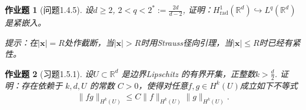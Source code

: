 \documentclass[UTF8,fontset=windows,12pt]{ctexart}
\theoremstyle{kaiti-theorem}
\newtheorem{problem}{作业题}
\numberwithin{equation}{section}
\newcommand{\R}{\mathbb{R}}
\newcommand{\bds}[1]{\boldsymbol{#1}}  %
\newcommand{\xx}{{\bds{x}}}
\begin{document}
\begin{problem}[问题1.4.5]
设$d\geqslant 2$, $2<q<2^*:=\frac{2d}{d-2}$, 证明：$H_{\text{rad}}^1(\R^d)\hookrightarrow L^q(\R^d)$ 是紧嵌入。

提示：在$|\xx|=R$处作截断，当$|\xx|>R$时用Strauss径向引理，当$|\xx|\leqslant R$时已经有紧性。
\end{problem}
\begin{problem}[习题1.5.1]
设$U\subset\R^d$ 是边界Lipschitz 的有界开集，正整数$k>\frac{d}{2}$.  证明：存在依赖于 $k,d,U$ 的常数 $C>0$，使得对任意$f,g\in H^k(U)$成立如下不等式
\begin{align*}
\|fg\|_{H^k(U)}\leqslant C\|f\|_{H^k(U)}\|g\|_{H^k(U)}.
\end{align*}
\end{problem}
\end{document}
